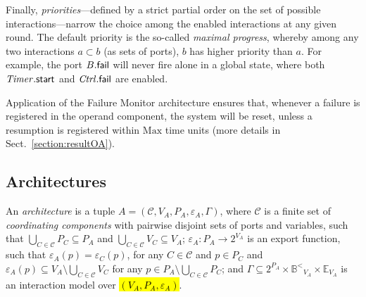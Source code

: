 \documentclass{llncs}
\newcommand{\sB}{\ensuremath{\mathbb{B}}}
\newcommand{\cC}{\ensuremath{\mathcal{C}}}
\newcommand{\sE}{\ensuremath{\mathbb{E}}}
\newcommand{\mdash}[1][]{---#1}
\newcommand{\ordbool}{\ensuremath{\sB^{<}}}
\newcommand{\guards}[1]{\ensuremath{\ordbool_{#1}}}
\newcommand{\exprs}[1]{\ensuremath{\sE_{#1}}}
\newcommand{\export}[1][]{\ensuremath{\varepsilon_{#1}}}
\begin{document}
Finally, \emph{priorities}\mdash defined by a strict partial order on
the set of possible interactions\mdash narrow the choice among the
enabled interactions at any given round.  The default priority is the
so-called \emph{maximal progress}, whereby among any two interactions
$a \subset b$ (as sets of ports), $b$ has higher priority than $a$.
For example, the port $B.\mathsf{fail}$ will never fire alone in
a global state, where both $\mathit{Timer}.\mathsf{start}$ and
$\mathit{Ctrl}.\mathsf{fail}$ are enabled.
%

Application of the Failure Monitor architecture ensures that, whenever
a failure is registered in the operand component, the system will be
reset, unless a resumption is registered within $\mathrm{Max}$ time
units (more details in Sect.~\ref{section:resultOA}).

\subsection{Architectures}
\label{secn:archi}

\begin{definition}[Architecture]
  \label{defn:arch}
  An \emph{architecture} is a tuple $A = (\cC, V_A, P_A, \export[A], \Gamma)$,
  where $\cC$ is a finite set of \emph{coordinating components}
  with pairwise disjoint sets of ports and variables, such that
  $\bigcup_{C \in \cC} P_C \subseteq P_A$ and
  $\bigcup_{C \in \cC} V_C \subseteq V_A$;
%
  $\export[A] : P_A \rightarrow 2^{V_A}$ is an export function, such
  that $\export[A](p) = \export[C](p)$, for any $C \in \cC$ and $p \in
  P_C$ and $\export[A](p) \subseteq V_A \setminus \bigcup_{C \in \cC}
  V_C$ for any $p \in P_A \setminus \bigcup_{C \in \cC} P_C$; and
%
  $\Gamma \subseteq 2^{P_A} \times \guards{V_A} \times \exprs{V_A}$
  is an interaction model over \hl{$(V_A, P_A, \export[A])$}.
\end{definition}
\end{document}
